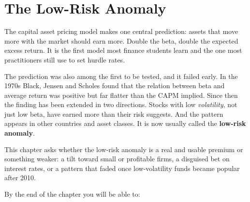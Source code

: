 \makeatletter
{}
\makeatother

\chapter{The Low-Risk Anomaly}
\label{ch:12}

The capital asset pricing model makes one central prediction: assets that move more with the market should earn more. Double the beta, double the expected excess return. It is the first model most finance students learn and the one most practitioners still use to set hurdle rates.

The prediction was also among the first to be tested, and it failed early. In the 1970s Black, Jensen and Scholes found that the relation between beta and average return was positive but far flatter than the CAPM implied. Since then the finding has been extended in two directions. Stocks with low \emph{volatility}, not just low beta, have earned more than their risk suggests. And the pattern appears in other countries and asset classes. It is now usually called the \textbf{low-risk anomaly}.

This chapter asks whether the low-risk anomaly is a real and usable premium or something weaker: a tilt toward small or profitable firms, a disguised bet on interest rates, or a pattern that faded once low-volatility funds became popular after 2010.

By the end of the chapter you will be able to:


